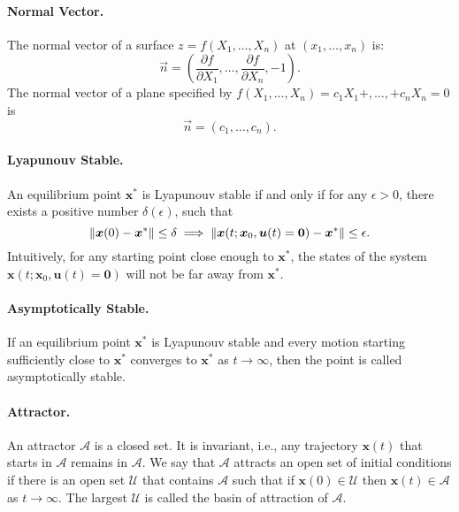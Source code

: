     \paragraph{Normal Vector.}
        The normal vector of a surface $z=f(X_1, \ldots, X_n)$ at $(x_1, \ldots, x_n)$ is:
            \begin{equation}
                \vec{n} = \left( \frac{\partial f}{\partial X_1} ,\ldots, \frac{\partial f}{\partial X_n} , -1  \right).
            \end{equation}
        The normal vector of a plane specified by $f(X_1, \ldots, X_n) = c_1 X_1 + , \ldots, + c_n X_n = 0$ is 
            \begin{equation}
                \vec{n} = \left( c_1, \ldots, c_n \right).
            \end{equation}
    \paragraph{Lyapunouv Stable.}
        An equilibrium point $\bm{x}^\ast$ is Lyapunouv stable if and only if for any $\epsilon > 0$, there exists a positive number $\delta(\epsilon)$, such that 
            \begin{equation}
                \lVert\bm{x}(0) - \bm{x}^\ast\rVert \le \delta \implies \lVert\bm{x}(t; \bm{x}_0, \bm{u}(t)=\bm{0}) - \bm{x}^\ast\rVert \le \epsilon.
            \end{equation}
        Intuitively, for any starting point close enough to $\bm{x}^\ast$, the states of the system $\bm{x}(t; \bm{x}_0, \bm{u}(t)=\bm{0})$ will not be far away from $\bm{x}^\ast$.
    \paragraph{Asymptotically Stable.}
        If an equilibrium point $\bm{x}^\ast$ is Lyapunouv stable and every motion starting sufficiently close to $\bm{x}^\ast$ converges to $\bm{x}^\ast$ as $t \rightarrow \infty$, then the point is called asymptotically stable.
    \paragraph{Attractor.}
        An attractor $\mathcal{A}$ is a closed set. 
        It is invariant, i.e., any trajectory $\bm{x}(t)$ that starts in $\mathcal{A}$ remains in $\mathcal{A}$.
        We say that $\mathcal{A}$ attracts an open set of initial conditions if there is an open set $\mathcal{U}$ that contains $\mathcal{A}$ such that if $\bm{x}(0) \in \mathcal{U}$ then $\bm{x}(t) \in \mathcal{A}$ as $t \rightarrow \infty$.
        The largest $\mathcal{U}$ is called the basin of attraction of $\mathcal{A}$.
